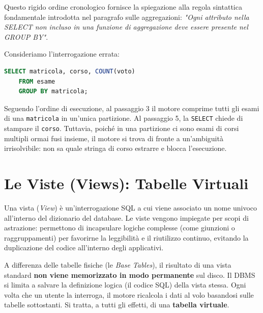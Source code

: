 \begin{dettagli}
    Questo rigido ordine cronologico fornisce la spiegazione alla regola sintattica fondamentale introdotta nel paragrafo sulle aggregazioni: \textit{"Ogni attributo nella SELECT non incluso in una funzione di aggregazione deve essere presente nel GROUP BY"}.

    \begin{example}
    Consideriamo l'interrogazione errata:
    \begin{lstlisting}[language=SQL, basicstyle=\ttfamily\small, keywordstyle=\color{blue}\bfseries]
    SELECT matricola, corso, COUNT(voto)
    FROM esame
    GROUP BY matricola;
    \end{lstlisting}
    Seguendo l'ordine di esecuzione, al passaggio 3 il motore comprime tutti gli esami di una \texttt{matricola} in un'unica partizione. Al passaggio 5, la \texttt{SELECT} chiede di stampare il \texttt{corso}. Tuttavia, poiché in una partizione ci sono esami di corsi multipli ormai fusi insieme, il motore si trova di fronte a un'ambiguità irrisolvibile: non sa quale stringa di corso estrarre e blocca l'esecuzione.
    \end{example}

\end{dettagli}

\section{Le Viste (Views): Tabelle Virtuali}

Una vista (\textit{View}) è un'interrogazione SQL a cui viene associato un nome univoco all'interno del dizionario del database. Le viste vengono impiegate per scopi di astrazione: permettono di incapsulare logiche complesse (come giunzioni o raggruppamenti) per favorirne la leggibilità e il riutilizzo continuo, evitando la duplicazione del codice all'interno degli applicativi.

\begin{observation}
A differenza delle tabelle fisiche (le \textit{Base Tables}), il risultato di una vista standard \textbf{non viene memorizzato in modo permanente} sul disco. Il DBMS si limita a salvare la definizione logica (il codice SQL) della vista stessa. Ogni volta che un utente la interroga, il motore ricalcola i dati al volo basandosi sulle tabelle sottostanti. Si tratta, a tutti gli effetti, di una \textbf{tabella virtuale}.
\end{observation}

